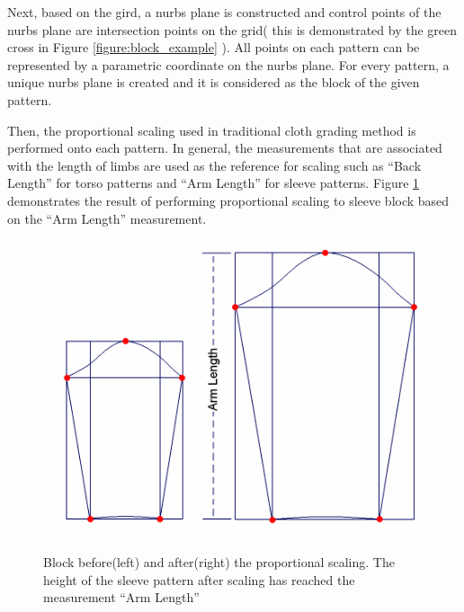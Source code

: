 Next, based on the gird, a nurbs plane is constructed and control points of the nurbs plane are intersection points on the grid( this is demonstrated by the green cross in Figure \ref{figure:block_example} ). All points on each pattern can be represented by a parametric coordinate on the nurbs plane. For every pattern, a unique nurbs plane is created and it is considered as the block of the given pattern. 

Then, the proportional scaling used in traditional cloth grading method is performed onto each pattern. In general, the measurements that are associated with the length of limbs are used as the reference for scaling such as ``Back Length'' for torso patterns and ``Arm Length'' for sleeve patterns. Figure \ref{figure:block_proportional} demonstrates the result of performing proportional scaling to sleeve block based on the ``Arm Length'' measurement.  

\begin{figure}[h]
	\centering
	\includegraphics[width=0.7\columnwidth]{../images/block_proportional_scaling}\\[0.1cm]
    \caption[Blocks before and after the proportional scaling]{Block before(left) and after(right) the proportional scaling. The height of the sleeve pattern after scaling has reached the measurement ``Arm Length''}
    \label{figure:block_proportional}
\end{figure}


